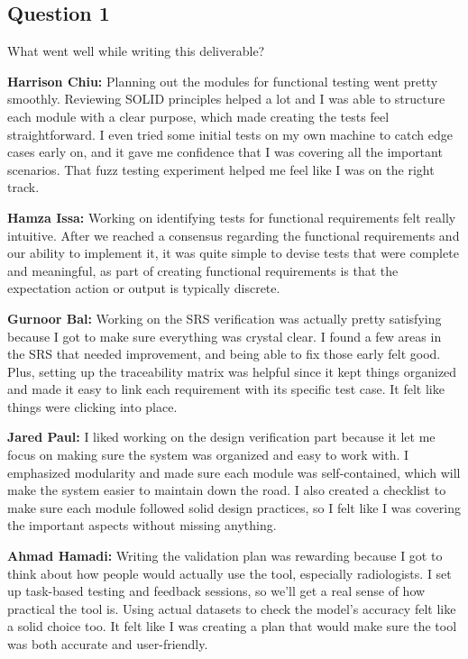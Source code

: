 \documentclass[12pt, titlepage]{article}
\begin{document}
\subsection{Question 1}
What went well while writing this deliverable?

\textbf{Harrison Chiu:}  Planning out the modules for functional testing went pretty smoothly. Reviewing SOLID principles helped a lot and I was able to structure each module with a clear purpose, which made creating the tests feel straightforward. I even tried some initial tests on my own machine to catch edge cases early on, and it gave me confidence that I was covering all the important scenarios. That fuzz testing experiment helped me feel like I was on the right track.

\textbf{Hamza Issa:} Working on identifying tests for functional requirements felt really intuitive. After we reached a consensus regarding the functional requirements and our ability to implement it, it was quite simple to devise tests that were complete and meaningful, as part of creating functional requirements is that the expectation action or output is typically discrete.

\textbf{Gurnoor Bal:} Working on the SRS verification was actually pretty satisfying because I got to make sure everything was crystal clear. I found a few areas in the SRS that needed improvement, and being able to fix those early felt good. Plus, setting up the traceability matrix was helpful since it kept things organized and made it easy to link each requirement with its specific test case. It felt like things were clicking into place.

\textbf{Jared Paul:} I liked working on the design verification part because it let me focus on making sure the system was organized and easy to work with. I emphasized modularity and made sure each module was self-contained, which will make the system easier to maintain down the road. I also created a checklist to make sure each module followed solid design practices, so I felt like I was covering the important aspects without missing anything.

\textbf{Ahmad Hamadi:} Writing the validation plan was rewarding because I got to think about how people would actually use the tool, especially radiologists. I set up task-based testing and feedback sessions, so we'll get a real sense of how practical the tool is. Using actual datasets to check the model's accuracy felt like a solid choice too. It felt like I was creating a plan that would make sure the tool was both accurate and user-friendly.
\end{document}
